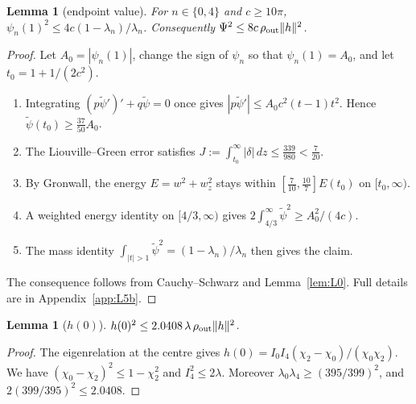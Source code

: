 \documentclass[11pt]{amsart}
\newtheorem{lemma}[proposition]{Lemma}
\theoremstyle{remark}
\numberwithin{equation}{section}
\begin{document}
\begin{lemma}[endpoint value]\label{lem:L5b}
For $n\in\{0,4\}$ and $c\ge10\pi$, $\psi_n(1)^2\le4c(1-\lambda_n)/\lambda_n$. Consequently $\Psi^2\le8c\,\rho_{\rm out}\|h\|^2$.
\end{lemma}
\begin{proof}
Let $A_0=|\psi_n(1)|$, change the sign of $\psi_n$ so that $\psi_n(1)=A_0$, and let $t_0=1+1/(2c^2)$.
\begin{enumerate}
\item Integrating $(p\tilde\psi')'+q\tilde\psi=0$ once gives $|p\tilde\psi'|\le A_0c^2(t-1)t^2$. Hence $\tilde\psi(t_0)\ge\frac{37}{50}A_0$.
\item The Liouville--Green error satisfies $J:=\int_{t_0}^\infty|\delta|\,dz\le\frac{339}{980}<\frac7{20}$.
\item By Gronwall, the energy $E=w^2+w_z^2$ stays within $[\frac7{10},\frac{10}7]E(t_0)$ on $[t_0,\infty)$.
\item A weighted energy identity on $[4/3,\infty)$ gives $2\int_{4/3}^\infty\tilde\psi^2\ge A_0^2/(4c)$.
\item The mass identity $\int_{|t|>1}\tilde\psi^2=(1-\lambda_n)/\lambda_n$ then gives the claim.
\end{enumerate}
The consequence follows from Cauchy--Schwarz and Lemma~\ref{lem:L0}. Full details are in Appendix~\ref{app:L5b}.
\end{proof}

\begin{lemma}[$h(0)$]\label{lem:H0}
$h(0)^2\le2.0408\,\lambda\,\rho_{\rm out}\|h\|^2$.
\end{lemma}
\begin{proof}
The eigenrelation at the centre gives $h(0)=I_0I_4(\chi_2-\chi_0)/(\chi_0\chi_2)$. We have $(\chi_0-\chi_2)^2\le1-\chi_2^2$ and $I_4^2\le2\lambda$. Moreover $\lambda_0\lambda_4\ge(395/399)^2$, and $2(399/395)^2\le2.0408$.
\end{proof}
\end{document}
